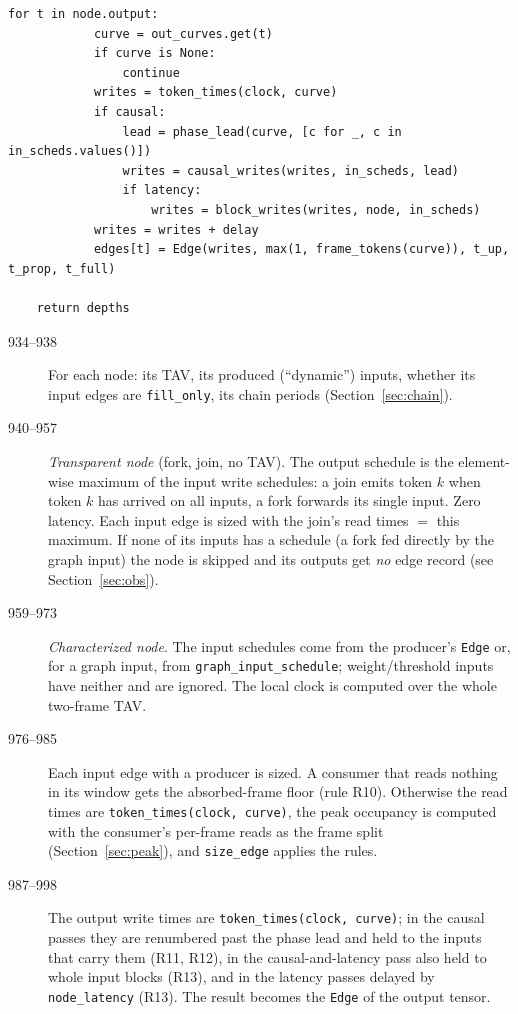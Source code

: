 \documentclass[10pt,a4paper]{article}
\newcommand{\code}[1]{\texttt{#1}}
\begin{document}
\begin{lstlisting}[firstnumber=934,title={\texttt{src/finn/transformation/fpgadataflow/derive\_characteristic.py}, lines 934--1000}]
        for t in node.output:
            curve = out_curves.get(t)
            if curve is None:
                continue
            writes = token_times(clock, curve)
            if causal:
                lead = phase_lead(curve, [c for _, c in in_scheds.values()])
                writes = causal_writes(writes, in_scheds, lead)
                if latency:
                    writes = block_writes(writes, node, in_scheds)
            writes = writes + delay
            edges[t] = Edge(writes, max(1, frame_tokens(curve)), t_up, t_prop, t_full)

    return depths
\end{lstlisting}

\begin{description}
\item[934--938] For each node: its TAV, its produced (``dynamic'') inputs, whether
  its input edges are \code{fill\_only}, its chain periods (Section~\ref{sec:chain}).
\item[940--957] \emph{Transparent node} (fork, join, no TAV). The output schedule
  is the element-wise maximum of the input write schedules: a join emits token
  $k$ when token $k$ has arrived on all inputs, a fork forwards its single input.
  Zero latency. Each input edge is sized with the join's read times
  $=$ this maximum. If none of its inputs has a schedule (a fork fed directly by
  the graph input) the node is skipped and its outputs get \emph{no} edge record
  (see Section~\ref{sec:obs}).
\item[959--973] \emph{Characterized node}. The input schedules come from the
  producer's \code{Edge} or, for a graph input, from \code{graph\_input\_schedule};
  weight/threshold inputs have neither and are ignored. The local clock is
  computed over the whole two-frame TAV.
\item[976--985] Each input edge with a producer is sized. A consumer that reads
  nothing in its window gets the absorbed-frame floor (rule R10). Otherwise the
  read times are \code{token\_times(clock, curve)}, the peak occupancy is computed
  with the consumer's per-frame reads as the frame split (Section~\ref{sec:peak}),
  and \code{size\_edge} applies the rules.
\item[987--998] The output write times are \code{token\_times(clock, curve)};
  in the causal passes they are renumbered past the phase lead and held to the inputs
  that carry them (R11, R12), in the causal-and-latency pass also held to whole
  input blocks (R13), and in the latency passes delayed by \code{node\_latency}
  (R13). The result becomes the \code{Edge} of the output tensor.
\end{description}
\end{document}
